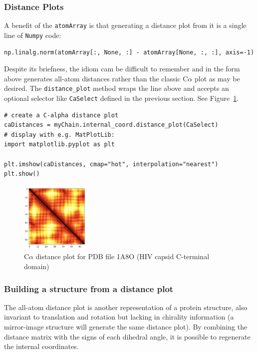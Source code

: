 \subsubsection{Distance Plots}

A benefit of the \texttt{atomArray} is that generating a distance plot from it
is a single line of \texttt{Numpy} code:

\begin{verbatim}
np.linalg.norm(atomArray[:, None, :] - atomArray[None, :, :], axis=-1)
\end{verbatim}

Despite its briefness, the idiom cam be difficult to remember and in the form
above generates all-atom distances rather than the classic C$\alpha$ plot
as may be desired.  The \texttt{distance\_plot\(\)} method wraps the line above
and accepts an optional selector like \texttt{CaSelect} defined in the previous
section.  See Figure~\ref{fig:distanceplot}.

\begin{verbatim}
# create a C-alpha distance plot
caDistances = myChain.internal_coord.distance_plot(CaSelect)
# display with e.g. MatPlotLib:
import matplotlib.pyplot as plt

plt.imshow(caDistances, cmap="hot", interpolation="nearest")
plt.show()
\end{verbatim}

\begin{figure}[h!]
\includegraphics[width=0.3\textwidth]{images/1a8o-ca-plot.png}
\caption{C$\alpha$ distance plot for PDB file 1A8O (HIV capsid C-terminal domain)}
\label{fig:distanceplot}
\end{figure}

\subsubsection{Building a structure from a distance plot}

The all-atom distance plot is another representation of a protein structure, also
invariant to translation and rotation but lacking in chirality information (a
mirror-image structure will generate the same distance plot).  By combining the
distance matrix with the signs of each dihedral angle, it is possible to regenerate
the internal coordinates.  

